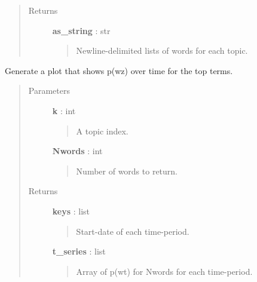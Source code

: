 \documentclass[letterpaper,10pt,english]{sphinxmanual}
\begin{document}
\begin{fulllineitems}
\begin{fulllineitems}
\begin{quote}
\begin{description}
\item[{Returns}] \leavevmode
\textbf{as\_string} : str
\begin{quote}

Newline-delimited lists of words for each topic.
\end{quote}

\end{description}\end{quote}

\end{fulllineitems}


\begin{fulllineitems}
\label{tethne.model.corpus.dtmmodel:tethne.model.corpus.dtmmodel.DTMModel.topic_evolution}
Generate a plot that shows p(w\textbar{}z) over time for the top 
terms.
\begin{quote}\begin{description}
\item[{Parameters}] \leavevmode
\textbf{k} : int
\begin{quote}

A topic index.
\end{quote}

\textbf{Nwords} : int
\begin{quote}

Number of words to return.
\end{quote}

\item[{Returns}] \leavevmode
\textbf{keys} : list
\begin{quote}

Start-date of each time-period.
\end{quote}

\textbf{t\_series} : list
\begin{quote}

Array of p(w\textbar{}t) for Nwords for each time-period.
\end{quote}

\end{description}\end{quote}

\end{fulllineitems}


\end{fulllineitems}
\end{document}
